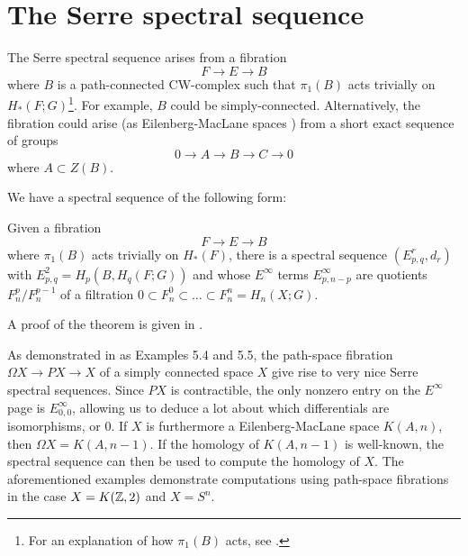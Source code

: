 \section{The Serre spectral sequence}
The Serre spectral sequence arises from a fibration
$$F\rightarrow E \rightarrow B$$
where $B$ is a path-connected CW-complex such that $\pi_1(B)$ acts trivially on $H_*(F;G)$\footnote{For an explanation of how $\pi_1(B)$ acts, see \cite{Hatcher-spec}.}.  For example, $B$ could be simply-connected. Alternatively, the fibration could arise (as Eilenberg-MacLane spaces \cite{Hatcher-spec}) from a short exact sequence of groups $$0\rightarrow A\rightarrow B\rightarrow C\rightarrow 0$$ where $A\subset Z(B)$. 

We have a spectral sequence of the following form:
\begin{theorem}
Given a fibration $$F\rightarrow E \rightarrow B$$ where $\pi_1(B)$ acts trivially on $H_*(F)$, there is a spectral sequence $(E_{p,q}^r,d_r)$ with $E_{p,q}^2=H_p(B,H_q(F;G))$ and whose $E^{\infty}$ terms $E^\infty_{p,n-p}$ are quotients $F_n^p/F_n^{p-1}$ of a filtration $0\subset F_n^0\subset\dots\subset F_n^n=H_n(X;G)$.
\end{theorem} A proof of the theorem is given in \cite{Hatcher-spec}.

As demonstrated in \cite{Hatcher-spec} as Examples 5.4 and 5.5, the path-space fibration $\Omega X\rightarrow PX\rightarrow X$ of a simply connected space $X$ give rise to very nice Serre spectral sequences. Since $PX$ is contractible, the only nonzero entry on the $E^\infty$ page is $E^{\infty}_{0,0}$, allowing us to deduce a lot about which differentials are isomorphisms, or $0$. If $X$ is furthermore a Eilenberg-MacLane space $K(A,n)$, then $\Omega X=K(A,n-1)$. If the homology of $K(A,n-1)$ is well-known, the spectral sequence can then be used to compute the homology of $X$. The aforementioned examples demonstrate computations using path-space fibrations in the case $X=K(\mathbb{Z},2)$ and $X=S^n$.

